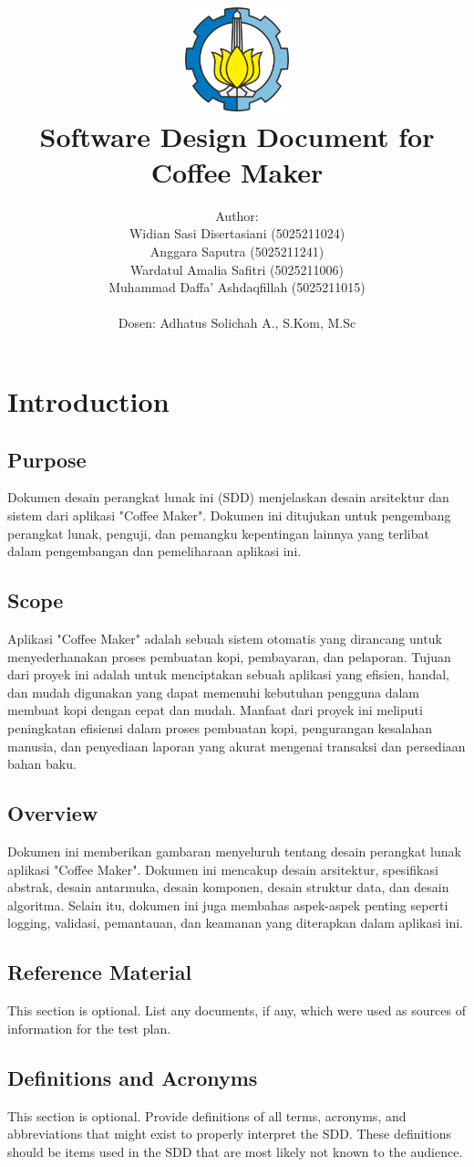 \documentclass[12pt]{article}
\title{
{\includegraphics[width=3cm, height=3cm]{img/LambangITS.png}}
\\
{Software Design Document for Coffee Maker}
}
\author{Author: 
\\Widian Sasi Disertasiani (5025211024) \\
Anggara Saputra (5025211241) \\
Wardatul Amalia Safitri (5025211006) \\
Muhammad Daffa’ Ashdaqfillah (5025211015) \\  
 \\ Dosen: Adhatus Solichah A., S.Kom, M.Sc}
\begin{document}
\maketitle

\section{Introduction}
\subsection{Purpose}
Dokumen desain perangkat lunak ini (SDD) menjelaskan desain arsitektur dan sistem dari aplikasi "Coffee Maker". Dokumen ini ditujukan untuk pengembang perangkat lunak, penguji, dan pemangku kepentingan lainnya yang terlibat dalam pengembangan dan pemeliharaan aplikasi ini.


\subsection{Scope}
Aplikasi "Coffee Maker" adalah sebuah sistem otomatis yang dirancang untuk menyederhanakan proses pembuatan kopi, pembayaran, dan pelaporan. Tujuan dari proyek ini adalah untuk menciptakan sebuah aplikasi yang efisien, handal, dan mudah digunakan yang dapat memenuhi kebutuhan pengguna dalam membuat kopi dengan cepat dan mudah. Manfaat dari proyek ini meliputi peningkatan efisiensi dalam proses pembuatan kopi, pengurangan kesalahan manusia, dan penyediaan laporan yang akurat mengenai transaksi dan persediaan bahan baku.

\subsection{Overview}
Dokumen ini memberikan gambaran menyeluruh tentang desain perangkat lunak aplikasi "Coffee Maker". Dokumen ini mencakup desain arsitektur, spesifikasi abstrak, desain antarmuka, desain komponen, desain struktur data, dan desain algoritma. Selain itu, dokumen ini juga membahas aspek-aspek penting seperti logging, validasi, pemantauan, dan keamanan yang diterapkan dalam aplikasi ini.

\subsection{Reference Material}
This section is optional.
List any documents, if any, which were used as sources of information for the test plan. 


\subsection{Definitions and Acronyms}
This section is optional.
Provide  definitions of all terms, acronyms, and  abbreviations that might exist to  properly 
interpret the SDD. These definitions should be items used in the SDD that are most likely not 
known to the audience.
\end{document}
